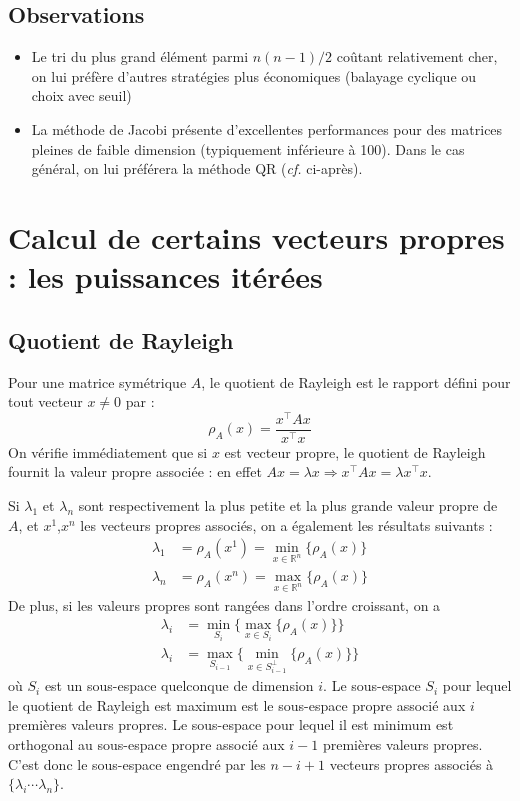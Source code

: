 \subsection{Observations}  %
\begin{itemize}
	\item Le tri du plus grand élément parmi $n(n-1)/2$ coûtant relativement cher, on lui préfère d'autres stratégies plus économiques (balayage cyclique ou choix avec seuil)
	\item La méthode de Jacobi présente d'excellentes performances pour des matrices pleines de faible dimension (typiquement inférieure à 100). Dans le cas général, on lui préférera la méthode QR ({\it cf.} ci-après).
\end{itemize}

\section{Calcul de certains vecteurs propres : les puissances itérées}

\subsection{Quotient de Rayleigh}
Pour une matrice symétrique $A$, le quotient de Rayleigh
est le rapport défini pour tout vecteur $x\neq 0$ par :
$$\rho_A(x)=\frac{x^\top Ax}{x^\top x}$$
On vérifie immédiatement que si $x$ est vecteur propre, le quotient de Rayleigh fournit la valeur propre associée : en effet $Ax=\lambda x \Rightarrow x^\top Ax=\lambda x^\top x$.

Si $\lambda_1$ et $\lambda_n$ sont respectivement la plus petite et la plus grande valeur propre de $A$, et $x^1$,$x^n$ les vecteurs propres associés, on a également les résultats suivants :
\begin{align*}
\lambda_1&=\rho_A(x^1)=\displaystyle\min_{x\in \mathbb{R}^n}\{\rho_A(x)\}\\
\lambda_n&=\rho_A(x^n)=\displaystyle\max_{x\in \mathbb{R}^n}\{\rho_A(x)\}
\end{align*}
De plus, si les valeurs propres sont rangées dans l'ordre croissant, on a 
\begin{align*}
\lambda_i&=\displaystyle\min_{S_i}\{\displaystyle\max_{x\in S_i}\{\rho_A(x)\}\}\\
\lambda_i&=\displaystyle\max_{S_{i-1}}\{\displaystyle\min_{x\in S_{i-1}^\bot}\{\rho_A(x)\}\}
\end{align*}
où $S_i$ est un sous-espace quelconque de dimension $i$.
\vskip 10pt
Le sous-espace $S_i$ pour lequel le quotient de Rayleigh est maximum est le sous-espace propre associé aux $i$ premières valeurs propres. Le sous-espace pour lequel il est minimum est orthogonal au sous-espace propre associé aux $i-1$ premières valeurs propres. C'est donc le sous-espace engendré par les $n-i+1$ vecteurs propres associés à $\{\lambda_i\cdots\lambda_n\}$.

